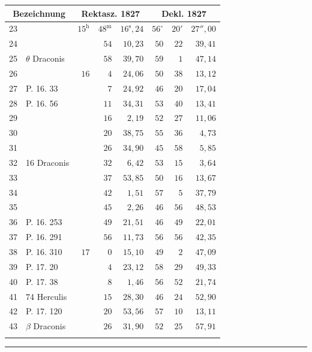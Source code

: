 \begin{center}
\begin{minipage}[t]{.49\textwidth}
{\begin{tabular}{r|l|rrr|rrr|}
\end{tabular}}\end{minipage}\hfill
\begin{minipage}[t]{.49\textwidth}\centering
{\scriptsize\setlength{\tabcolsep}{1.2pt}\renewcommand{\arraystretch}{1.2}\begin{tabular}{r|l|rrr|rrr}
\multicolumn{2}{c|}{Bezeichnung}&\multicolumn{3}{c|}{Rektasz. 1827}&\multicolumn{3}{c|}{Dekl. 1827}\\\hline
23&&$15^{\mathrm h}$&$48^{\mathrm m}$&$16^{\mathrm s}{,}24$&$56^\circ$&$20'$&$27''{,}00$\\
24&&&$54$&$10{,}23$&$50$&$22$&$39{,}41$\\
25&$\theta$ Draconis&&$58$&$39{,}70$&$59$&$1$&$47{,}14$\\
26&&$16$&$4$&$24{,}06$&$50$&$38$&$13{,}12$\\
27&P. 16. 33&&$7$&$24{,}92$&$46$&$20$&$17{,}04$\\
28&P. 16. 56&&$11$&$34{,}31$&$53$&$40$&$13{,}41$\\
29&&&$16$&$2{,}19$&$52$&$27$&$11{,}06$\\
30&&&$20$&$38{,}75$&$55$&$36$&$4{,}73$\\
31&&&$26$&$34{,}90$&$45$&$58$&$5{,}85$\\
32&16 Draconis&&$32$&$6{,}42$&$53$&$15$&$3{,}64$\\
33&&&$37$&$53{,}85$&$50$&$16$&$13{,}67$\\
34&&&$42$&$1{,}51$&$57$&$5$&$37{,}79$\\
35&&&$45$&$2{,}26$&$46$&$56$&$48{,}53$\\
36&P. 16. 253&&$49$&$21{,}51$&$46$&$49$&$22{,}01$\\
37&P. 16. 291&&$56$&$11{,}73$&$56$&$56$&$42{,}35$\\
38&P. 16. 310&$17$&$0$&$15{,}10$&$49$&$2$&$47{,}09$\\
39&P. 17. 20&&$4$&$23{,}12$&$58$&$29$&$49{,}33$\\
40&P. 17. 38&&$8$&$1{,}46$&$56$&$52$&$21{,}74$\\
41&74 Herculis&&$15$&$28{,}30$&$46$&$24$&$52{,}90$\\
42&P. 17. 120&&$20$&$53{,}56$&$57$&$10$&$13{,}11$\\
43&$\beta$ Draconis&&$26$&$31{,}90$&$52$&$25$&$57{,}91$\\
&&&&&&&\\
\end{tabular}}\end{minipage}
\end{center}
\begin{center}\rule{.24\textwidth}{.4pt}\end{center}

